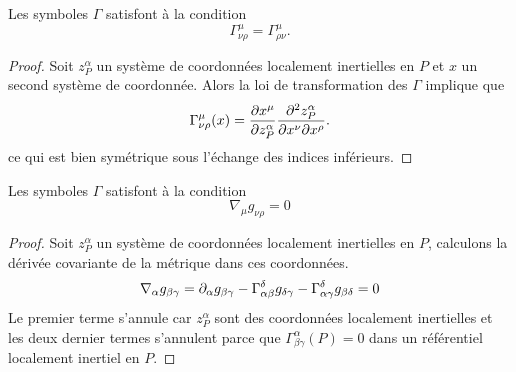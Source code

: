 \documentclass[a4paper,11pt]{report}
\begin{document}
                \begin{prop}\begin{leftbar}
                    Les symboles $\Gamma$ satisfont à la condition
                    \begin{equation}
                        \Gamma^\mu_{\nu\rho} = \Gamma^\mu_{\rho\nu}.
                    \end{equation}
                \end{leftbar}\end{prop}
                
                \begin{proof}
                    Soit $z^\alpha_P$ un système de coordonnées localement inertielles en $P$ et $x$ un second système de coordonnée. Alors la loi de transformation des $\Gamma$ implique que
                    \begin{equation}
                        \Gamma^\mu_{\nu\rho}(x) = \pdv{x^\mu}{z^\alpha_P}\pdv{z^\alpha_P}{x^\nu}{x^\rho}.
                    \end{equation}
                    ce qui est bien symétrique sous l'échange des indices inférieurs.
                \end{proof}
                
                \begin{prop}\begin{leftbar}
                    Les symboles $\Gamma$ satisfont à la condition
                    \begin{equation}
                        \nabla_\mu g_{\nu\rho} = 0
                    \end{equation}
                \end{leftbar}\end{prop}
                
                \begin{proof}
                    Soit $z^\alpha_P$ un système de coordonnées localement inertielles en $P$, calculons la dérivée covariante de la métrique dans ces coordonnées.
                    \begin{equation}
                        \nabla_\alpha g_{\beta\gamma} = \partial_\alpha g_{\beta\gamma} - \Gamma^\delta_{\alpha\beta}g_{\delta\gamma} - \Gamma^\delta_{\alpha\gamma}g_{\beta\delta} = 0
                    \end{equation}
                    Le premier terme s'annule car $z^\alpha_P$ sont des coordonnées localement inertielles et les deux dernier termes s'annulent parce que  $\Gamma^\alpha_{\beta\gamma}(P) = 0$ dans un référentiel localement inertiel en $P$.
                \end{proof}
                
\end{document}
